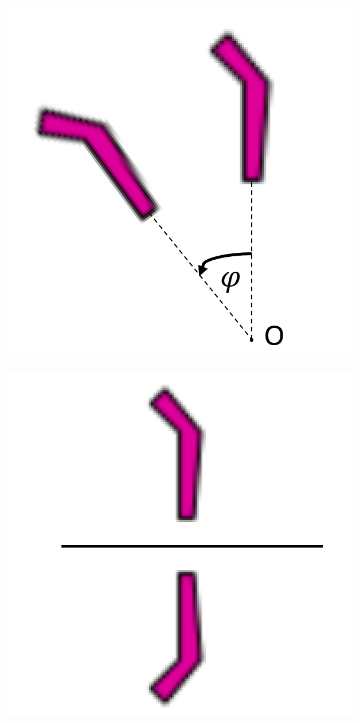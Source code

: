 \documentclass[12pt]{report}
\begin{document}
\begin{figure}[H]
\begin{subfigure}[b]{0.22\textwidth}
  \end{subfigure}
  \begin{subfigure}[b]{0.24\textwidth}
    \includegraphics[width=.9\textwidth]{crtez_rotacija.png}
    \label{fig:f5}
    \end{subfigure}
  \begin{subfigure}[b]{0.24\textwidth}
    \includegraphics[width=.9\textwidth]{crtez_refleksija.png}
    \label{fig:f5}
    

\end{subfigure}
\end{figure}
\end{document}
